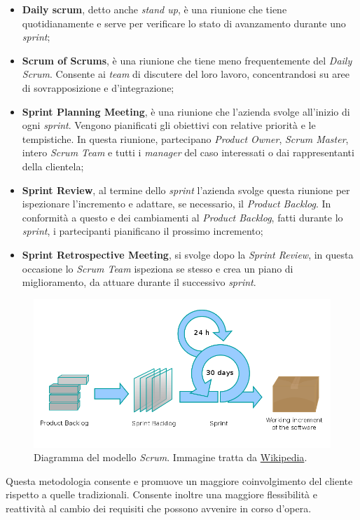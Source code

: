 \begin{itemize}
\item \textbf{Daily scrum}, detto anche \emph{stand up}, è una riunione che tiene quotidianamente e serve per verificare lo stato di avanzamento durante uno \emph{sprint};
\item \textbf{Scrum of Scrums}, è una riunione che tiene meno frequentemente del \emph{Daily Scrum}. Consente ai \emph{team} di discutere del loro lavoro, concentrandosi su aree di sovrapposizione e d'integrazione;
\item \textbf{Sprint Planning Meeting}, è una riunione che l'azienda svolge all'inizio di ogni \emph{sprint}. Vengono pianificati gli obiettivi con relative priorità e le tempistiche. In questa riunione, partecipano \emph{Product Owner}, \emph{Scrum Master}, intero \emph{Scrum Team} e tutti i \emph{manager} del caso interessati o dai rappresentanti della clientela;
\item \textbf{Sprint Review}, al termine dello \emph{sprint} l'azienda svolge questa riunione per ispezionare l'incremento e adattare, se necessario, il \emph{Product Backlog}. In conformità a questo e dei cambiamenti al \emph{Product Backlog}, fatti durante lo \emph{sprint}, i partecipanti pianificano il prossimo incremento;
\item \textbf{Sprint Retrospective Meeting}, si svolge dopo la \emph{Sprint Review}, in questa occasione lo \emph{Scrum Team} ispeziona se stesso e crea un piano di miglioramento, da attuare durante il successivo \emph{sprint}.
\end{itemize}
\begin{figure}[h]
\centering
\includegraphics[scale=0.35]{immagini/scrum}
\caption{Diagramma del modello \emph{Scrum}. Immagine tratta da \href{https://it.wikipedia.org/wiki/Scrum_(informatica)}{Wikipedia}.}
\label{fig:scrum}
\end{figure}
\newpage
Questa metodologia consente e promuove un maggiore coinvolgimento del cliente rispetto a quelle tradizionali. Consente inoltre una maggiore flessibilità e reattività al cambio dei requisiti che possono avvenire in corso d'opera.




